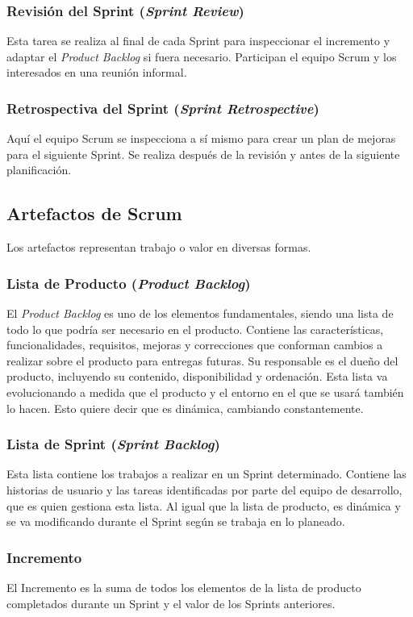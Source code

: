 \subsubsection{Revisión del Sprint (\textit{Sprint Review})}
Esta tarea se realiza al final de cada Sprint para inspeccionar el incremento y adaptar el \textit{Product Backlog} si fuera necesario. Participan el equipo Scrum y los interesados en una reunión informal.

\subsubsection{Retrospectiva del Sprint (\textit{Sprint Retrospective})}
Aquí el equipo Scrum se inspecciona a sí mismo para crear un plan de mejoras para el siguiente Sprint. Se realiza después de la revisión y antes de la siguiente planificación.

\newpage

\subsection{Artefactos de Scrum}
Los artefactos \cite{Schwaber2017} representan trabajo o valor en diversas formas.

\subsubsection{Lista de Producto (\textit{Product Backlog})}
El \textit{Product Backlog} es uno de los elementos fundamentales, siendo una lista de todo lo que podría ser necesario en el producto. Contiene las características, funcionalidades, requisitos, mejoras y correcciones que conforman cambios a realizar sobre el producto para entregas futuras. Su responsable es el dueño del producto, incluyendo su contenido, disponibilidad y ordenación. Esta lista va evolucionando a medida que el producto y el entorno en el que se usará también lo hacen. Esto quiere decir que es dinámica, cambiando constantemente.

\subsubsection{Lista de Sprint (\textit{Sprint Backlog})}
Esta lista \cite{Gomez2017} contiene los trabajos a realizar en un Sprint determinado. Contiene las historias de usuario y las tareas identificadas por parte del equipo de desarrollo, que es quien gestiona esta lista. Al igual que la lista de producto, es dinámica y se va modificando durante el Sprint según se trabaja en lo planeado.

\subsubsection{Incremento}
El Incremento \cite{Schwaber2017} es la suma de todos los elementos de la lista de producto completados durante un Sprint y el valor de los Sprints anteriores.